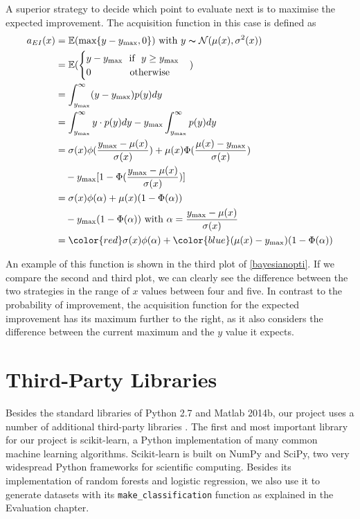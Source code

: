 \documentclass[a4paper,12pt,twoside,openright]{report}
\begin{document}
A superior strategy to decide which point to evaluate next is to maximise the expected improvement. The acquisition function in this case is defined \cite{eipaper} as
\begin{align}
a_{EI}(x) &= \mathbb{E}(\text{max}\{y - y_{\text{max}}, 0\}) \text{\ with\ } y \thicksim \mathcal{N}(\mu(x),\sigma^2(x))\\
&= \mathbb{E}(\begin{cases}
        y-y_{\text{max}} \text{\ \ if\ \ } y \geq y_{\text{max}}
        \\
        0 \text{\ \ \ \ \ \ \ \ \ \ \ \ otherwise}
        \end{cases})\\
&= \int_{y_{\text{max}}}^\infty (y-y_{\text{max}})p(y)dy\\
&= \int_{y_{\text{max}}}^\infty y\cdot p(y)dy-y_{\text{max}}\int_{y_{\text{max}}}^\infty p(y)dy\\
&= \sigma(x)\phi(\frac{y_{\text{max}}-\mu(x)}{\sigma(x)}) + \mu(x)\Phi(\frac{\mu(x) - y_{\text{max}}}{\sigma(x)}) \\
&\quad - y_{\text{max}}[1-\Phi(\frac{y_{\text{max}} - \mu(x)}{\sigma(x)})]\\
&= \sigma(x)\phi(\alpha) + \mu(x)(1-\Phi(\alpha))\\
&\quad - y_{\text{max}}(1-\Phi(\alpha)) \text{\ with\ } \alpha = \frac{y_{\text{max}}-\mu(x)}{\sigma(x)}\\
&= {\color{red}\sigma(x)}\phi(\alpha) + {\color{blue}(\mu(x)- y_{\text{max}})}(1-\Phi(\alpha))
\end{align}


An example of this function is shown in the third plot of \ref{bayesianopti}. If we compare the second and third plot, we can clearly see the difference between the two strategies in the range of $x$ values between four and five. In contrast to the probability of improvement, the acquisition function for the expected improvement has its maximum further to the right, as it also considers the difference between the current maximum and the $y$ value it expects.

\section{Third-Party Libraries}
Besides the standard libraries of Python 2.7 and Matlab 2014b, our project uses a number of additional third-party libraries . The first and most important library for our project is scikit-learn, a Python implementation of many common machine learning algorithms. Scikit-learn is built on NumPy and SciPy, two very widespread Python frameworks for scientific computing. Besides its implementation of random forests and logistic regression, we also use it to generate datasets with its \texttt{make\_classification} function as explained in the Evaluation chapter.
\end{document}

